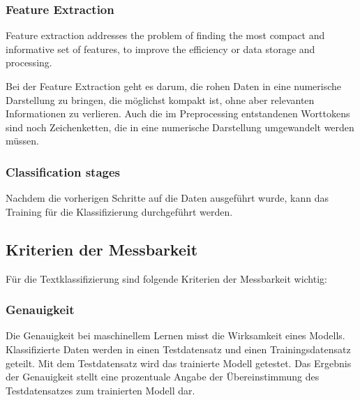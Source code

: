 \subsubsection{Feature Extraction}
\begin{definition}
	\label{def:feature-extraction}
	\glqq Feature extraction addresses the problem of finding the most compact and informative set of features, to improve the efficiency or data storage and processing.\grqq{} \citep{Guyon2006}
\end{definition}
Bei der Feature Extraction geht es darum, die rohen Daten in eine numerische Darstellung zu bringen, die möglichst kompakt ist, ohne aber relevanten Informationen zu verlieren.
Auch die im Preprocessing entstandenen Worttokens sind noch Zeichenketten, die in eine numerische Darstellung umgewandelt werden müssen.

\subsubsection{Classification stages}
Nachdem die vorherigen Schritte auf die Daten ausgeführt wurde, kann das Training für die Klassifizierung durchgeführt werden.

\subsection{Kriterien der Messbarkeit}
\label{c:conception:classification:criteria}
Für die Textklassifizierung sind folgende Kriterien der Messbarkeit wichtig:

\subsubsection{Genauigkeit}
Die Genauigkeit bei maschinellem Lernen misst die Wirksamkeit eines Modells. Klassifizierte Daten werden in einen Testdatensatz und einen Trainingsdatensatz geteilt. Mit dem Testdatensatz wird das trainierte Modell getestet. Das Ergebnis der Genauigkeit stellt eine prozentuale Angabe der Übereinstimmung des Testdatensatzes zum trainierten Modell dar. \citep[vgl.][]{select_ml_2021}

